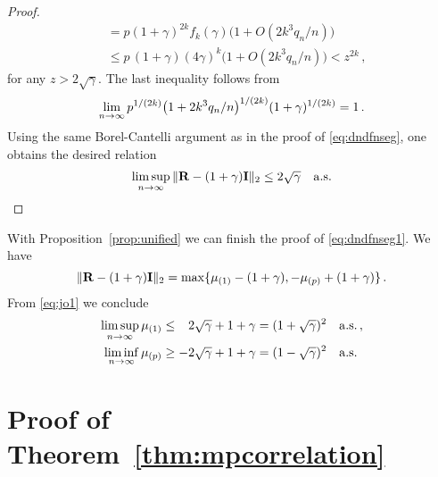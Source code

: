 \begin{proof}
\begin{equation*}
\begin{split}
&= p(1+\gamma)^{2k} f_k(\gamma) \big(1+O(2k^3 q_n/n)\big)\\
&\le p\,(1+\gamma) (4\gamma)^k \big(1+O(2k^3 q_n/n)\big) < z^{2k}\,,
\end{split}
\end{equation*}
for any $z>2\sqrt{\gamma}$. The last inequality follows from
\begin{equation*}
\lim_{n \to \infty} p^{1/(2k)} \big(1+2k^3 q_n/n \big)^{1/(2k)}(1+\gamma)^{1/(2k)} 
= 1\,.
\end{equation*}
Using the same Borel-Cantelli argument as in the proof of \eqref{eq:dndfnseg}, one obtains the desired relation
\begin{equation*}
\limsup_{n\to \infty} \|{\mathbf R}-(1+\gamma) {\mathbf I}\|_2 \le  2 \sqrt{\gamma}\quad {\rm a.s.}
\end{equation*}
\end{proof}
With Proposition~\ref{prop:unified} we can finish the proof of \eqref{eq:dndfnseg1}.
We have 
\begin{equation*}
\|{\mathbf R}-(1+\gamma) {\mathbf I}\|_2 = \max \{\mu_{(1)}- (1+\gamma), -\mu_{(p)}+(1+\gamma)\}\,.
\end{equation*}
From \eqref{eq:jo1} we conclude
\begin{equation*}
\begin{split}
\limsup_{n\to \infty}\mu_{(1)} &\le \phantom{-} 2 \sqrt{\gamma}+1+\gamma=(1+\sqrt{\gamma})^2 \quad {\rm a.s.}\,,\\
\liminf_{n\to \infty}\mu_{(p)} &\ge -2 \sqrt{\gamma}+1+\gamma=(1-\sqrt{\gamma})^2\quad {\rm a.s.}
\end{split}
\end{equation*}


\section{Proof of Theorem~\ref{thm:mpcorrelation}}\label{sec:6}
